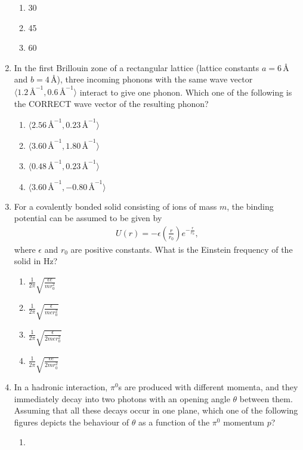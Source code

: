 \documentclass[journal]{IEEEtran}
\begin{document}
\begin{enumerate}
\begin{enumerate}
\item 30
\item 45
\item 60
\end{enumerate}
\item In the first Brillouin zone of a rectangular lattice (lattice constants $a = 6 \, \text{Å}$ and $b = 4 \, \text{Å}$), three incoming phonons with the same wave vector $\langle 1.2 \, \text{Å}^{-1}, 0.6 \, \text{Å}^{-1} \rangle$ interact to give one phonon. Which one of the following is the CORRECT wave vector of the resulting phonon?
\begin{enumerate}
\item $\langle 2.56 \, \text{Å}^{-1}, 0.23 \, \text{Å}^{-1} \rangle$
\item $\langle 3.60 \, \text{Å}^{-1}, 1.80 \, \text{Å}^{-1} \rangle $
\item $\langle 0.48 \, \text{Å}^{-1}, 0.23 \, \text{Å}^{-1} \rangle$
\item $\langle 3.60 \, \text{Å}^{-1}, -0.80 \, \text{Å}^{-1} \rangle$
\end{enumerate}
\item For a covalently bonded solid consisting of ions of mass $m$, the binding potential can be assumed to be given by 
\begin{align*}
	U(r) = -\epsilon \left ( \frac{r}{r_0} \right)e^{-\frac{r}{r_0}},
\end{align*}
where $\epsilon$ and $r_0$ are positive constants. What is the Einstein frequency of the solid in Hz?
\begin{enumerate}
\item $\frac{1}{2\pi} \sqrt{\frac{\epsilon e}{m r_0^2}}$
\item $\frac{1}{2\pi} \sqrt{\frac{\epsilon }{me r_0^2}}$
\item $\frac{1}{2\pi} \sqrt{\frac{\epsilon }{2me r_0^2}}$
\item $\frac{1}{2\pi} \sqrt{\frac{\epsilon e}{2m r_0^2}}$
\end{enumerate}
\item In a hadronic interaction, $\pi^0$s are produced with different momenta, and they immediately decay into two photons with an opening angle $\theta$ between them. Assuming that all these decays occur in one plane, which one of the following figures depicts the behaviour of $\theta$ as a function of the $\pi^0$ momentum $p$?
\begin{enumerate}
\item 
\begin{figure}[H]

\end{figure}
\end{enumerate}
\end{enumerate}
\end{document}
